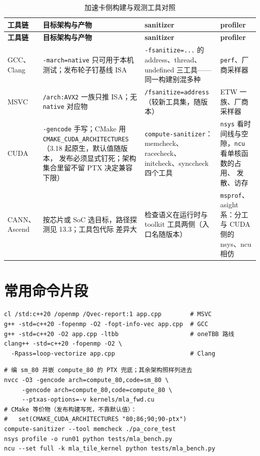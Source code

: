 \documentclass[12pt,a4paper,fontset=fandol]{ctexbook}
\newcommand{\Tp}[1]{\texttt{#1}}
\newcommand{\Bk}{\allowbreak}
\begin{document}
\begin{longtable}{@{}>{\raggedright\arraybackslash}p{}
  >{\raggedright\arraybackslash}p{}
  >{\raggedright\arraybackslash}p{}
  >{\raggedright\arraybackslash}p{}@{}}
\caption{加速卡侧构建与观测工具对照}\label{tab:accel-tools}\\
\toprule
\textbf{工具链} & \textbf{目标架构与产物} & \textbf{sanitizer} &
\textbf{profiler} \\
\midrule
\endfirsthead
\toprule
\textbf{工具链} & \textbf{目标架构与产物} & \textbf{sanitizer} &
\textbf{profiler} \\
\midrule
\endhead
\bottomrule
\endfoot
GCC、Clang & \Tp{-march=native} 只可用于本机测试；发布轮子钉基线
ISA & \Tp{-fsanitize=...} 的 address、thread、undefined 三工具——
同一构建别混多种 & \Tp{perf}、厂商采样器 \\
MSVC & \Tp{/arch:AVX2} 一族只推 ISA；无 \Tp{native} 对应物 &
\Tp{/fsanitize=\Bk address}（较新工具集，随版本） & ETW 一族、厂商采样器 \\
CUDA & \Tp{-gencode} 手写；CMake 用
\Tp{CMAKE\_CUDA\Bk\_ARCHITECTURES}（3.18 起原生，默认值随版本，
发布必须显式钉死；架构集合里留不留 PTX 决定兼容下限） &
\Tp{compute-\Bk sanitizer}：memcheck、racecheck、initcheck、synccheck
四个工具 & \Tp{nsys} 看时间线与空隙，\Tp{ncu} 看单核函数的占用、
发散、访存 \\
CANN、Ascend & 按芯片或 SoC 选目标，路径探测见 13.3；工具包代际
差异大 & 检查语义在运行时与 toolkit 工具两侧（入口名随版本） &
\Tp{msprof}、asight 系：分工与 CUDA 侧的 nsys、ncu 相仿 \\
\end{longtable}

\section{常用命令片段}

\begin{lstlisting}[style=shellstyle,caption={主机侧三件套：OpenMP、TBB、向量化诊断}]
cl /std:c++20 /openmp /Qvec-report:1 app.cpp        # MSVC
g++ -std=c++20 -fopenmp -O2 -fopt-info-vec app.cpp  # GCC
g++ -std=c++20 -O2 app.cpp -ltbb                    # oneTBB 路线
clang++ -std=c++20 -fopenmp -O2 \
  -Rpass=loop-vectorize app.cpp                     # Clang
\end{lstlisting}

\begin{lstlisting}[style=shellstyle,caption={CUDA：架构显式化、资源诊断与观测}]
# 编 sm_80 并嵌 compute_80 的 PTX 兜底；其余架构照样列进去
nvcc -O3 -gencode arch=compute_80,code=sm_80 \
     -gencode arch=compute_80,code=compute_80 \
     --ptxas-options=-v kernels/mla_fwd.cu
# CMake 等价物（发布构建写死，不靠默认值）：
#   set(CMAKE_CUDA_ARCHITECTURES "80;86;90;90-ptx")
compute-sanitizer --tool memcheck ./pa_core_test
nsys profile -o run01 python tests/mla_bench.py
ncu --set full -k mla_tile_kernel python tests/mla_bench.py
\end{lstlisting}
\end{document}
